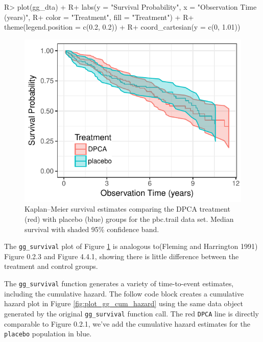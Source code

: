 \documentclass[article]{jss}
\begin{document}
\begin{Schunk}
\begin{Sinput}
R> plot(gg_dta) +
R+   labs(y = "Survival Probability", x = "Observation Time (years)",
R+        color = "Treatment", fill = "Treatment") +
R+   theme(legend.position = c(0.2, 0.2)) +
R+   coord_cartesian(y = c(0, 1.01))
\end{Sinput}
\begin{figure}[!htb]

{\centering \includegraphics{fig-rfs/rfs-plot_gg_survival-1} 

}

\caption[Kaplan--Meier survival estimates comparing the DPCA treatment (red) with placebo (blue) groups for the pbc.trail data set]{Kaplan--Meier survival estimates comparing the DPCA treatment (red) with placebo (blue) groups for the pbc.trail data set. Median survival with shaded 95\% confidence band.}\label{fig:plot_gg_survival}
\end{figure}
\end{Schunk}

The \texttt{gg\_survival} plot of Figure \ref{fig:plot_gg_survival} is
analogous to(Fleming and Harrington 1991) Figure 0.2.3 and Figure 4.4.1,
showing there is little difference between the treatment and control
groups.

The \texttt{gg\_survival} function generates a variety of time-to-event
estimates, including the cumulative hazard. The follow code block
creates a cumulative hazard plot \cite[Figure 0.2.1]{fleming:1991} in
Figure \ref{fig:plot_gg_cum_hazard} using the same data object generated
by the original \texttt{gg\_survival} function call. The red
\texttt{DPCA} line is directly comparable to Figure 0.2.1, we've add the
cumulative hazard estimates for the \texttt{placebo} population in blue.
\end{document}
